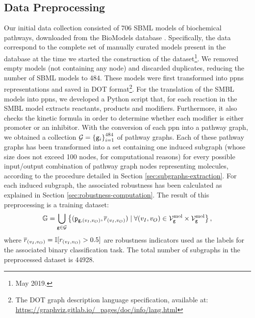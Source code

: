 \subsection{Data Preprocessing}\label{subsec:data-collection}
Our initial data collection consisted of 706 SBML models of biochemical pathways, downloaded from the BioModels database \cite{le2006biomodels}. Specifically, the data correspond to the complete set of manually curated models present in the database at the time we started the construction of the dataset\footnote{May 2019.}. We removed empty models (not containing any node) and discarded duplicates, reducing the number of SBML models to 484. These models were first transformed into \glspl{ppn} representations and saved in DOT format\footnote{The DOT graph description language specification, available at: \url{https://graphviz.gitlab.io/_pages/doc/info/lang.html}}. For the translation of the SMBL models into \glspl{ppn}, we developed a Python script that, for each reaction in the SMBL model extracts reactants, products and modifiers. Furthermore, it also checks the kinetic formula in order to determine whether each modifier is either promoter or an inhibitor. With the conversion of each \gls{ppn} into a pathway graph, we obtained a collection $\Cal{G} = \Set{\Graph{g}_i}_{i=1}^{484}$ of pathway graphs. Each of these pathway graphs has been transformed into a set containing one induced subgraph (whose size does not exceed 100 nodes, for computational reasons) for every possible input/output combination of pathway graph nodes representing molecules, according to the procedure detailed in Section \ref{sec:subgraphs-extraction}. For each induced subgraph, the associated robustness has been calculated as explained in Section \ref{sec:robustness-computation}. The result of this preprocessing is a training dataset:
$$\mathbb{G} = \bigcup\limits_{\Graph{g} \in \Cal{G}} \Set{(\Graph{p}_{\Graph{g}, (v_I, v_O)}, \overline{r}_{(v_I,v_O)}) \mid \forall (v_I,v_O) \in \Nodes_{\Graph{g}}^{\Fun{mol}} \times \Nodes_{\Graph{g}}^{\Fun{mol}}},$$
where $\overline{r}_{(v_I,v_O)} = \mathbb{I}[r_{(v_I,v_O)} > 0.5]$ are robustness indicators used as the labels for the associated binary classification task. The total number of subgraphs in the preprocessed dataset is 44928.


